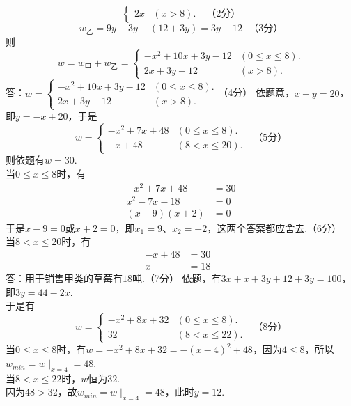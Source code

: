 \documentclass[10pt]{article}
\begin{document}
\begin{questions}{\answeringintroduction}
\begin{subquestions}
$$\begin{cases}
                2x & (x > 8).
            \end{cases} \ \ \ （2分）$$
            $$w_乙 = 9y-3y-(12+3y) = 3y-12 \ \ \ （3分）$$
            则
            $$w = w_甲+w_乙 =
            \begin{cases}
                -x^2+10x+3y-12 & (0 \leq x \leq 8). \\
                2x+3y-12 & (x > 8).
            \end{cases}$$
            答：$w = \begin{cases}
                -x^2+10x+3y-12 & (0 \leq x \leq 8). \\
                2x+3y-12 & (x > 8).
            \end{cases}$（4分）
        \subquestion 依题意，$x+y=20$，即$y=-x+20$，于是
        $$w = \begin{cases}
            -x^2+7x+48 & (0 \leq x \leq 8). \\
            -x+48 & (8 < x \leq 20).
        \end{cases} \ \ \ （5分）$$
        则依题有$w = 30$.\\
        当$0 \leq x \leq 8$时，有
        $$\begin{aligned}
            -x^2+7x+48 &= 30 \\
            x^2-7x-18  &= 0 \\
            (x-9)(x+2) &= 0
        \end{aligned}$$
        于是$x-9=0$或$x+2=0$，即$x_1=9$、$x_2=-2$，这两个答案都应舍去.（6分）\\
        当$8 < x \leq 20$时，有
        $$\begin{aligned}
            -x+48 &= 30 \\
            x &= 18 \ \ \
        \end{aligned}$$
        答：用于销售甲类的草莓有$18$吨.（7分）
        \subquestion 依题，有$3x+x+3y+12+3y=100$，即$3y=44-2x$. \\
        于是有
        $$w = \begin{cases}
            -x^2+8x+32 & (0 \leq x \leq 8). \\
            32 & (8 < x \leq 22).
        \end{cases} \ \ \ （8分）$$
        当$0 \leq x \leq 8$时，有$w = -x^2+8x+32 = -(x-4)^2 + 48$，因为$4 \leq 8$，所以$w_{min} = w\mid_{x=4} = 48$. \\
        当$8 < x \leq 22$时，$w$恒为$32$. \\
        因为$48 > 32$，故$w_{min} = w\mid_{x=4} = 48$，此时$y=12$. \\

\end{subquestions}
\end{questions}
\end{document}
